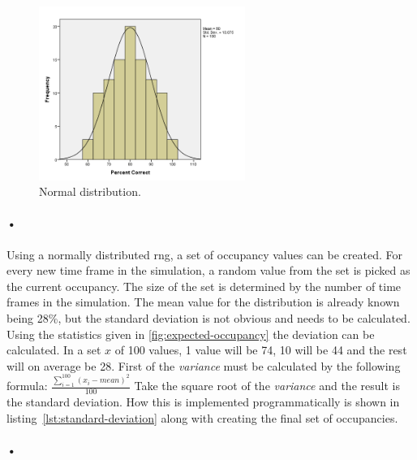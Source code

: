 \documentclass[a4paper, 12pt]{report}\dfrac{\right }{•}
\begin{document}
\begin{figure}[h!]
	\centering
		\includegraphics[width=0.6\textwidth]{images/normal-dist.png}
		\caption[Normal distribution.]{Normal distribution. \cite{normal-dist-image}}
		\label{fig:normal-dist}
\end{figure}

\paragraph{•}
Using a normally distributed \gls{rng}, a set of occupancy values can be created.
For every new time frame in the simulation, a random value from the set is picked as the current occupancy.
The size of the set is determined by the number of time frames in the simulation.
The mean value for the distribution is already known being 28\%, but the standard deviation is not obvious and needs to be calculated.
Using the statistics given in \ref{fig:expected-occupancy} the deviation can be calculated.
In a set $x$ of 100 values, 1 value will be 74, 10 will be 44 and the rest will on average be 28.
First of the \textit{variance} must be calculated by the following formula:
$ \frac{\sum_{i=1}^{100} (x_i - mean)^2}{100}$
Take the square root of the \textit{variance} and the result is the standard deviation.
How this is implemented programmatically is shown in listing~\ref{lst:standard-deviation} along with creating the final set of occupancies.

\paragraph{•}
\begin{minipage}{\linewidth}

\end{minipage}
\end{document}
